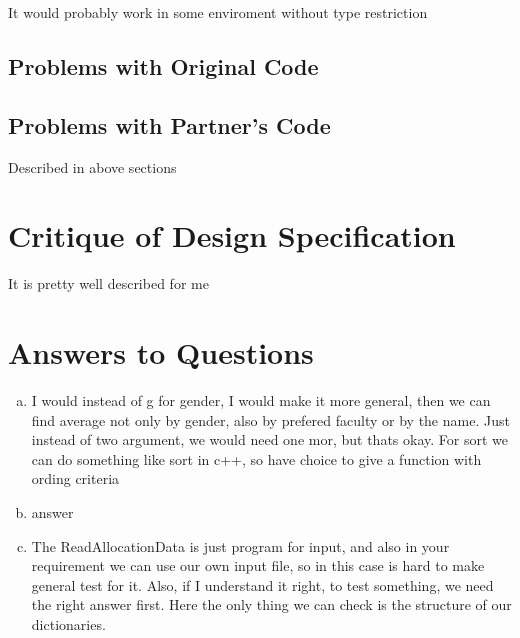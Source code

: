 \documentclass[12pt]{article}
\begin{document}
It would probably work in some enviroment without type restriction

\subsection{Problems with Original Code}

\subsection{Problems with Partner's Code}

Described in above sections

\section{Critique of Design Specification}

It is pretty well described for me


\section{Answers to Questions}

\begin{enumerate}[(a)]

\item I would instead of g for gender, I would make it more general, then we can find average
not only by gender, also by prefered faculty or by the name. Just instead of two argument, we
would need one mor, but thats okay.
For sort we can do something like sort in c++, so have choice to give a function with 
ording criteria

\item answer

\item The ReadAllocationData is just program for input, and also in your requirement we can 
use our own input file, so in this case is hard to make general test for it. Also, if I
understand it right, to test something, we need the right answer first. Here the only thing we can 
check is the structure of our dictionaries.

\end{enumerate}

\newpage

\lstset{language=Python, basicstyle=\tiny, breaklines=true, showspaces=false,
  showstringspaces=false, breakatwhitespace=true}
\end{document}
